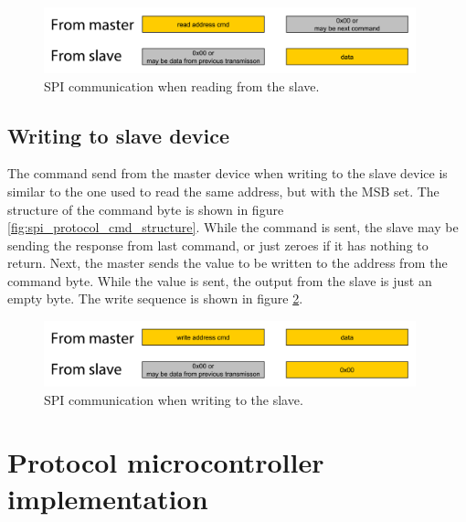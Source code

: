 \begin{figure}[htb]
	\centering
	\includegraphics[width=0.96\textwidth]{graphics/spi_protocol_command_structure_read_wlabels.pdf} %
	\caption{SPI communication when reading from the slave.}
	\label{fig:spi_protocol_command_structure_read}			%
\end{figure}


\subsection{Writing to slave device}
The command send from the master device when writing to the slave device is similar to the one used to read the same address, but with the MSB set. The structure of the command byte is shown in figure \ref{fig:spi_protocol_cmd_structure}. While the command is sent, the slave may be sending the response from last command, or just zeroes if it has nothing to return. Next, the master sends the value to be written to the address from the command byte. While the value is sent, the output from the slave is just an empty byte. The write sequence is shown in figure \ref{fig:spi_protocol_command_structure_write}.


\begin{figure}[htb]
	\centering
	\includegraphics[width=0.96\textwidth]{graphics/spi_protocol_command_structure_write_wlabels.pdf} %
	\caption{SPI communication when writing to the slave.}
	\label{fig:spi_protocol_command_structure_write}			%
\end{figure}



\section{Protocol microcontroller implementation}


